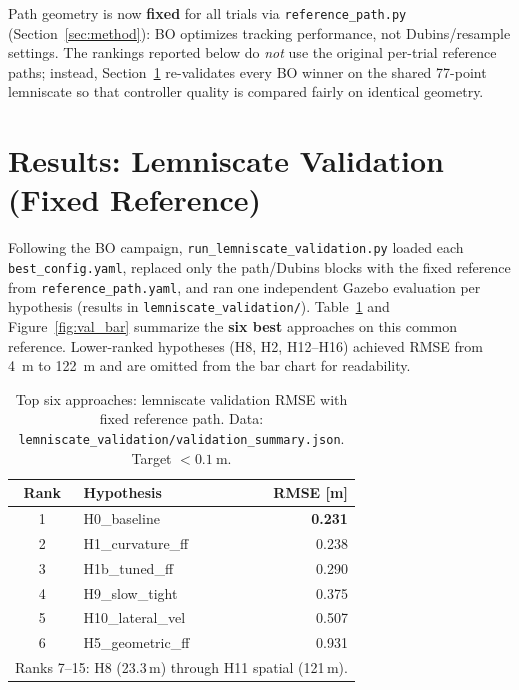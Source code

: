 \documentclass[11pt,a4paper]{article}
\begin{document}
Path geometry is now \textbf{fixed} for all trials via \texttt{reference\_path.py}
(Section~\ref{sec:method}): BO optimizes tracking performance, not Dubins/resample settings.
The rankings reported below do \emph{not} use the original per-trial reference paths; instead,
Section~\ref{sec:results} re-validates every BO winner on the shared 77-point lemniscate so
that controller quality is compared fairly on identical geometry.

\section{Results: Lemniscate Validation (Fixed Reference)}
\label{sec:results}

Following the BO campaign, \texttt{run\_lemniscate\_validation.py} loaded each
\texttt{best\_config.yaml}, replaced only the path/Dubins blocks with the fixed reference
from \texttt{reference\_path.yaml}, and ran one independent Gazebo evaluation per hypothesis
(results in \texttt{lemniscate\_validation/}). Table~\ref{tab:val_top6} and
Figure~\ref{fig:val_bar} summarize the \textbf{six best} approaches on this common reference.
Lower-ranked hypotheses (H8, H2, H12--H16) achieved RMSE from \SI{4}{\meter} to
\SI{122}{\meter} and are omitted from the bar chart for readability.

\begin{table}[H]
  \centering
  \caption{Top six approaches: lemniscate validation RMSE with fixed reference path.
           Data: \texttt{lemniscate\_validation/validation\_summary.json}.
           Target $< \SI{0.1}{\meter}$.}
  \label{tab:val_top6}
  \small
  \begin{tabular}{@{}clr@{}}
    \toprule
    Rank & Hypothesis & RMSE [m] \\
    \midrule
    1  & H0\_baseline       & \textbf{0.231} \\
    2  & H1\_curvature\_ff  & 0.238 \\
    3  & H1b\_tuned\_ff     & 0.290 \\
    4  & H9\_slow\_tight    & 0.375 \\
    5  & H10\_lateral\_vel  & 0.507 \\
    6  & H5\_geometric\_ff  & 0.931 \\
    \bottomrule
    \multicolumn{3}{l}{\footnotesize Ranks 7--15: H8 (23.3\,m) through H11 spatial (121\,m).}
  \end{tabular}
\end{table}
\end{document}
